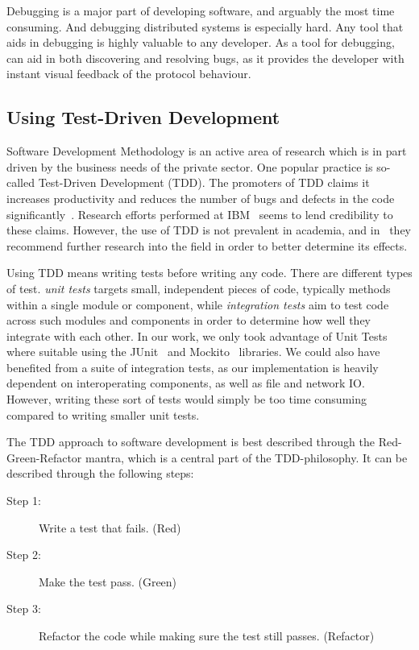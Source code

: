 Debugging is a major part of developing software, and arguably the most
time consuming. And debugging distributed systems is especially hard.
Any tool that aids in debugging is highly valuable to any developer. As
a tool for debugging, \demo{} can aid in both discovering and resolving
bugs, as it provides the developer with instant visual feedback of the
protocol behaviour.


\subsection{Using Test-Driven Development}

Software Development Methodology is an active area of research
which is in part driven by the business needs of the private
sector\cite{janzen2005test}. One popular practice is so-called Test-Driven
Development (TDD). The promoters of TDD claims it increases
productivity and reduces the number of bugs and defects in the
code significantly~\cite{beck2003test}. Research
efforts performed at IBM~\cite{maximilien2003assessing} seems to
lend credibility to these claims. However, the use of TDD is not
prevalent in academia, and in~\cite{janzen2005test} they
recommend further research into the field in order to better
determine its effects.

Using TDD means writing tests before writing any code. There are
different types of test. \emph{unit tests} targets small,
independent pieces of code, typically methods within a single
module or component, while \emph{integration tests} aim to test
code across such modules and components in order to determine
how well they integrate with each other. In our work, we only
took advantage of Unit Tests where suitable using the
JUnit~\cite{junit} and Mockito~\cite{mockito} libraries.
We could also have benefited from a suite of integration tests,
as our implementation is heavily dependent on interoperating
components, as well as file and network IO\@. However, writing
these sort of tests would simply be too time consuming compared
to writing smaller unit tests.

The TDD approach to software development is best described through the
Red-Green-Refactor mantra, which is a central part of the
TDD-philosophy. It can be described through the following steps:

\begin{description}
    \item[Step 1:] Write a test that fails. (Red)
    \item[Step 2:] Make the test pass. (Green)
    \item[Step 3:] Refactor the code while making sure the test
        still passes. (Refactor)
\end{description}

